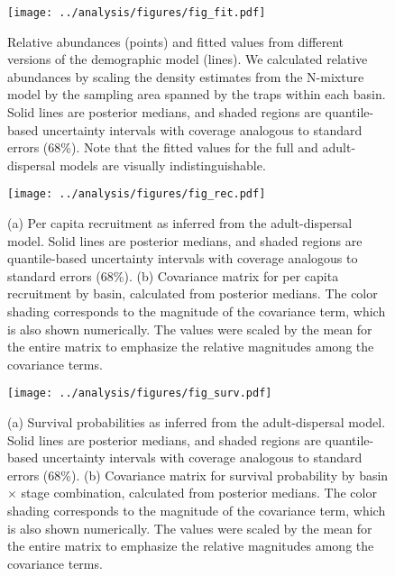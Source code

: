 \documentclass[11pt]{article}
\begin{document}
\clearpage
\begin{figure}
\centering
\texttt{[image: ../analysis/figures/fig\_fit.pdf]}
\caption{\label{fig:fit}
Relative abundances (points) and fitted values from different versions
of the demographic model (lines).
We calculated relative abundances by scaling the density estimates from the
N-mixture model by the sampling area spanned by the traps within each basin.
Solid lines are posterior medians,
and shaded regions are quantile-based uncertainty intervals
with coverage analogous to standard errors (68\%).
Note that the fitted values for the full and adult-dispersal models
are visually indistinguishable.
}
\end{figure}
\clearpage

\clearpage
\begin{figure}
\centering
\texttt{[image: ../analysis/figures/fig\_rec.pdf]}
\caption{\label{fig:rec}
(a) Per capita recruitment as inferred from the adult-dispersal model.
Solid lines are posterior medians,
and shaded regions are quantile-based uncertainty intervals
with coverage analogous to standard errors (68\%).
(b) Covariance matrix for per capita recruitment by basin,
calculated from posterior medians.
The color shading corresponds to the magnitude of the covariance term,
which is also shown numerically.
The values were scaled by the mean for the entire matrix to emphasize
the relative magnitudes among the covariance terms.
}
\end{figure}
\clearpage

\clearpage
\begin{figure}
\centering
\texttt{[image: ../analysis/figures/fig\_surv.pdf]}
\caption{\label{fig:surv}
(a) Survival probabilities as inferred from the adult-dispersal model.
Solid lines are posterior medians,
and shaded regions are quantile-based uncertainty intervals
with coverage analogous to standard errors (68\%).
(b) Covariance matrix for survival probability by basin $\times$ stage combination,
calculated from posterior medians.
The color shading corresponds to the magnitude of the covariance term,
which is also shown numerically.
The values were scaled by the mean for the entire matrix to emphasize
the relative magnitudes among the covariance terms.
}
\end{figure}
\clearpage
\end{document}

